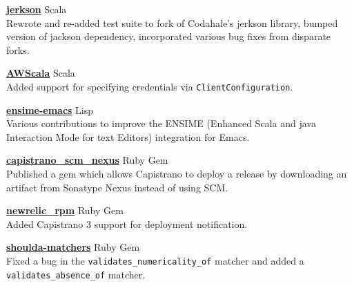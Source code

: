 \documentclass[10pt,letterpaper]{altacv}
\begin{document}
\clearpage


\href{https://github.com/gilt/jerkson}{\textbf{jerkson}} \hfill
{\footnotesize{} Scala} \\
Rewrote and re-added test suite to fork of Codahale's jerkson library,
bumped version of jackson dependency, incorporated various bug fixes
from disparate forks.

\divider

\href{https://github.com/seratch/AWScala}{\textbf{AWScala}} \hfill
{\footnotesize{} Scala} \\
Added support for specifying credentials via
\verb|ClientConfiguration|.

\divider

\href{https://github.com/ensime/ensime-emacs}{\textbf{ensime-emacs}}
\hfill{\footnotesize {} Lisp} \\
Various contributions to improve the ENSIME (Enhanced Scala and java
Interaction Mode for text Editors) integration for Emacs.

\divider

\href{https://github.com/jmpage/capistrano_scm_nexus}{\textbf{capistrano\_scm\_nexus}} \hfill {\footnotesize{} Ruby Gem} \\
Published a gem which allows Capistrano to deploy a release by
downloading an artifact from Sonatype Nexus instead of using SCM.

\divider

\href{https://github.com/newrelic/rpm}{\textbf{newrelic\_rpm}} \hfill {\footnotesize{} Ruby Gem} \\
Added Capistrano 3 support for deployment notification.

\divider

\href{https://github.com/thoughtbot/shoulda-matchers}{\textbf{shoulda-matchers}} \hfill {\footnotesize{} Ruby Gem} \\
Fixed a bug in the \verb|validates_numericality_of| matcher and added a \verb|validates_absence_of| matcher.\\
\end{document}
